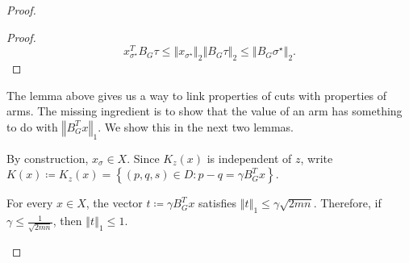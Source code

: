 {\begin{proof}
{\begin{proof}
{\begin{equation*}
x_{\sigma^{\star}}^{T} B_{G} \tau \le {\left\Vert x_{\sigma^{\star}} \right\Vert}_{2} {\left\Vert B_{G} \tau \right\Vert}_{2} \le {\left\Vert B_{G} \sigma^{\star} \right\Vert}_{2} .
\end{equation*}

}

\end{proof}
}

The lemma above gives us a way to link properties of cuts with properties of arms. The missing ingredient is to show that the value of an arm has something to do with ${\left\Vert B_{G}^{T} x \right\Vert}_{1}$. We show this in the next two lemmas.

By construction, $x_{\sigma} \in X$. Since $K_{z} \left( x \right)$ is independent of $z$, write
$K \left( x \right) \coloneqq K_{z} \left( x \right) = \left\{ \left( p , q , s \right) \in D : p - q = \gamma B_{G}^{T} x \right\} .$


\begin{lemma}

  For every $x \in X$, the vector $t \coloneqq \gamma B_{G}^{T} x$ satisfies
  ${\left\Vert t \right\Vert}_{1} \le \gamma \sqrt{2 m n}$. Therefore, if
  $\gamma \le \frac{1}{\sqrt{2 m n}}$, then ${\left\Vert t \right\Vert}_{1} \le 1$.

\end{lemma}





\end{proof}}
